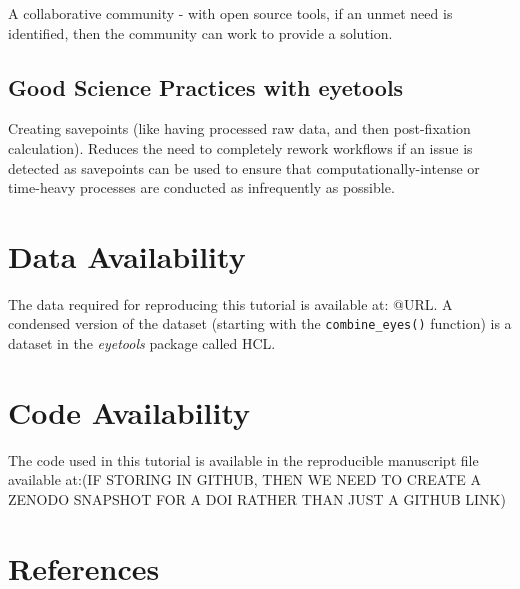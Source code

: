 \documentclass[
  man,
  floatsintext,
  longtable,
  nolmodern,
  notxfonts,
  notimes,
  colorlinks=true,linkcolor=blue,citecolor=blue,urlcolor=blue]{apa7}
\begin{document}
A collaborative community - with open source tools, if an unmet need is
identified, then the community can work to provide a solution.

\subsection{Good Science Practices with
eyetools}\label{good-science-practices-with-eyetools}

Creating savepoints (like having processed raw data, and then
post-fixation calculation). Reduces the need to completely rework
workflows if an issue is detected as savepoints can be used to ensure
that computationally-intense or time-heavy processes are conducted as
infrequently as possible.

\section{Data Availability}\label{data-availability}

The data required for reproducing this tutorial is available at: @URL. A
condensed version of the dataset (starting with the
\texttt{combine\_eyes()} function) is a dataset in the \emph{eyetools}
package called HCL.

\section{Code Availability}\label{code-availability}

The code used in this tutorial is available in the reproducible
manuscript file available at:(IF STORING IN GITHUB, THEN WE NEED TO
CREATE A ZENODO SNAPSHOT FOR A DOI RATHER THAN JUST A GITHUB LINK)

\section{References}\label{references}
\end{document}
